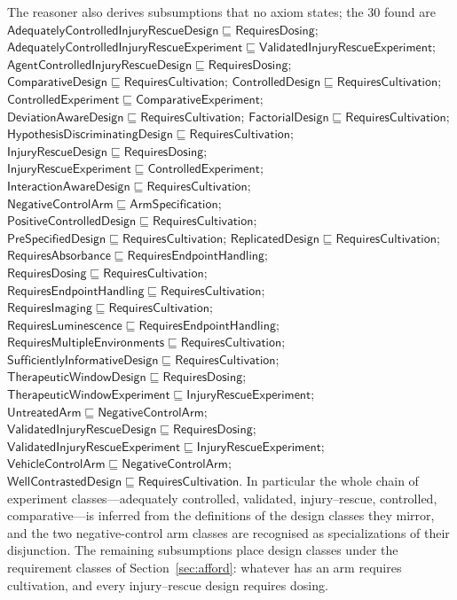\documentclass[10pt,a4paper]{article}
\begin{document}
The reasoner also derives subsumptions that no axiom states; the 30 found are
$\mathsf{AdequatelyControlledInjuryRescueDesign} \sqsubseteq \mathsf{RequiresDosing}$; $\mathsf{AdequatelyControlledInjuryRescueExperiment} \sqsubseteq \mathsf{ValidatedInjuryRescueExperiment}$; $\mathsf{AgentControlledInjuryRescueDesign} \sqsubseteq \mathsf{RequiresDosing}$; $\mathsf{ComparativeDesign} \sqsubseteq \mathsf{RequiresCultivation}$; $\mathsf{ControlledDesign} \sqsubseteq \mathsf{RequiresCultivation}$; $\mathsf{ControlledExperiment} \sqsubseteq \mathsf{ComparativeExperiment}$; $\mathsf{DeviationAwareDesign} \sqsubseteq \mathsf{RequiresCultivation}$; $\mathsf{FactorialDesign} \sqsubseteq \mathsf{RequiresCultivation}$; $\mathsf{HypothesisDiscriminatingDesign} \sqsubseteq \mathsf{RequiresCultivation}$; $\mathsf{InjuryRescueDesign} \sqsubseteq \mathsf{RequiresDosing}$; $\mathsf{InjuryRescueExperiment} \sqsubseteq \mathsf{ControlledExperiment}$; $\mathsf{InteractionAwareDesign} \sqsubseteq \mathsf{RequiresCultivation}$; $\mathsf{NegativeControlArm} \sqsubseteq \mathsf{ArmSpecification}$; $\mathsf{PositiveControlledDesign} \sqsubseteq \mathsf{RequiresCultivation}$; $\mathsf{PreSpecifiedDesign} \sqsubseteq \mathsf{RequiresCultivation}$; $\mathsf{ReplicatedDesign} \sqsubseteq \mathsf{RequiresCultivation}$; $\mathsf{RequiresAbsorbance} \sqsubseteq \mathsf{RequiresEndpointHandling}$; $\mathsf{RequiresDosing} \sqsubseteq \mathsf{RequiresCultivation}$; $\mathsf{RequiresEndpointHandling} \sqsubseteq \mathsf{RequiresCultivation}$; $\mathsf{RequiresImaging} \sqsubseteq \mathsf{RequiresCultivation}$; $\mathsf{RequiresLuminescence} \sqsubseteq \mathsf{RequiresEndpointHandling}$; $\mathsf{RequiresMultipleEnvironments} \sqsubseteq \mathsf{RequiresCultivation}$; $\mathsf{SufficientlyInformativeDesign} \sqsubseteq \mathsf{RequiresCultivation}$; $\mathsf{TherapeuticWindowDesign} \sqsubseteq \mathsf{RequiresDosing}$; $\mathsf{TherapeuticWindowExperiment} \sqsubseteq \mathsf{InjuryRescueExperiment}$; $\mathsf{UntreatedArm} \sqsubseteq \mathsf{NegativeControlArm}$; $\mathsf{ValidatedInjuryRescueDesign} \sqsubseteq \mathsf{RequiresDosing}$; $\mathsf{ValidatedInjuryRescueExperiment} \sqsubseteq \mathsf{InjuryRescueExperiment}$; $\mathsf{VehicleControlArm} \sqsubseteq \mathsf{NegativeControlArm}$; $\mathsf{WellContrastedDesign} \sqsubseteq \mathsf{RequiresCultivation}$. In particular the whole chain
of experiment classes---adequately controlled, validated, injury--rescue, controlled, comparative---is inferred from
the definitions of the design classes they mirror, and the two negative-control arm classes are recognised as
specializations of their disjunction. The remaining subsumptions place design classes under the requirement classes
of Section~\ref{sec:afford}: whatever has an arm requires cultivation, and every injury--rescue design requires dosing.
\end{document}
